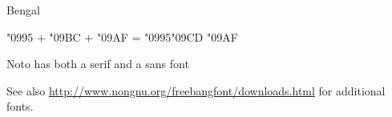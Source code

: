 \begin{scriptexample}[]{Bengal}
\end{scriptexample}





\bgroup
\bengali\LARGE
\char"0995 + \color{blue} \char"09BC + \color{red}\char"09AF  = \char"0995\char"09CD \char"09AF
\egroup

Noto has both a serif and a sans font 

See also \url{http://www.nongnu.org/freebangfont/downloads.html} for additional fonts.









